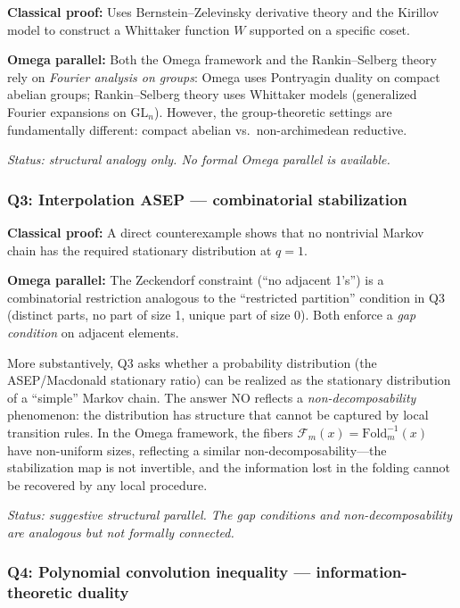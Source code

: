 \noindent\textbf{Classical proof:} Uses Bernstein--Zelevinsky derivative
theory and the Kirillov model to construct a Whittaker function $W$
supported on a specific coset.

\noindent\textbf{Omega parallel:}
Both the Omega framework and the Rankin--Selberg theory rely on
\emph{Fourier analysis on groups}: Omega uses Pontryagin duality on
compact abelian groups; Rankin--Selberg theory uses Whittaker models
(generalized Fourier expansions on $\mathrm{GL}_n$).
However, the group-theoretic settings are fundamentally different:
compact abelian vs.\ non-archimedean reductive.

\emph{Status: structural analogy only.  No formal Omega parallel is available.}

\subsubsection*{Q3: Interpolation ASEP --- combinatorial stabilization}

\noindent\textbf{Classical proof:} A direct counterexample shows that no
nontrivial Markov chain has the required stationary distribution at $q=1$.

\noindent\textbf{Omega parallel:}
The Zeckendorf constraint (``no adjacent 1's'') is a combinatorial
restriction analogous to the ``restricted partition'' condition in Q3
(distinct parts, no part of size 1, unique part of size 0).
Both enforce a \emph{gap condition} on adjacent elements.

More substantively, Q3 asks whether a probability distribution
(the ASEP/Macdonald stationary ratio) can be realized as the
stationary distribution of a ``simple'' Markov chain.
The answer NO reflects a \emph{non-decomposability} phenomenon:
the distribution has structure that cannot be captured by local transition
rules.  In the Omega framework, the fibers
$\mathcal F_m(x)=\mathrm{Fold}_m^{-1}(x)$ have non-uniform sizes,
reflecting a similar non-decomposability---the stabilization map is
not invertible, and the information lost in the folding cannot be
recovered by any local procedure.

\emph{Status: suggestive structural parallel.  The gap conditions and
non-decomposability are analogous but not formally connected.}


\subsubsection*{Q4: Polynomial convolution inequality ---
  information-theoretic duality}

